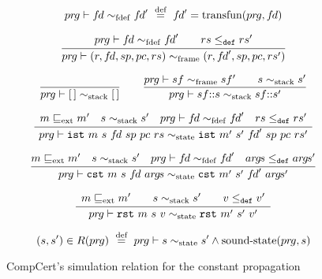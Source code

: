 
\begin{figure}[!]
$${pr\hspace*{-1pt}g} \vdash {f\hspace*{-1pt}d} \sim_{\mathrm{fdef}} {f\hspace*{-1pt}d}' ~\stackrel{\text{def}}{=}~ {f\hspace*{-1pt}d}' = \mathrm{transfun}({pr\hspace*{-1pt}g},{f\hspace*{-1pt}d})$$

\[
 \frac{
\begin{array}{c}
{pr\hspace*{-1pt}g} \vdash {f\hspace*{-1pt}d} \sim_{\mathrm{fdef}} {f\hspace*{-1pt}d}' \qquad
 rs \le_{\mathtt{def}} rs'
\end{array}
 }
 {
{pr\hspace*{-1pt}g} \vdash (r,{f\hspace*{-1pt}d},sp,pc,rs) \sim_{\mathrm{frame}} (r,{f\hspace*{-1pt}d}',sp,pc,rs')
 }
\]

\[
\frac{
}{
{pr\hspace*{-1pt}g} \vdash  [\,] \sim_{\mathrm{stack}} [\,]
}
\qquad
\frac{
{pr\hspace*{-1pt}g} \vdash  sf \sim_{\mathrm{frame}} sf' \qquad s \sim_{\mathrm{stack}} s'
}{
{pr\hspace*{-1pt}g} \vdash  sf{::}s \sim_{\mathrm{stack}} sf{::}s'
}
\]


\[
 \frac{
\begin{array}{c}
 m \sqsubseteq_\mathrm{ext}  m' \quad
 s \sim_{\mathrm{stack}} s' \quad
{pr\hspace*{-1pt}g} \vdash {f\hspace*{-1pt}d} \sim_{\mathrm{fdef}} {f\hspace*{-1pt}d}' \quad
 rs \le_{\mathtt{def}} rs'
\end{array}
 }
 {
{pr\hspace*{-1pt}g} \vdash
\mathtt{ist}~m~s~{f\hspace*{-1pt}d}~sp~pc~rs \sim_{\mathrm{state}}
\mathtt{ist}~m'~s'~{f\hspace*{-1pt}d}'~sp~pc~rs'
 }
\]


\[
 \frac{
\begin{array}{@{}c@{}}
m \sqsubseteq_\mathrm{ext}  m' \quad
s \simStack s' \quad
\vprg \vdash \vfd \simFun \vfd' \quad
\vargs \le_\rtldef \vargs' 
\end{array}
 }
 {
\vprg \vdash
\rtlcst~m~s~\vfd~\vargs \simState 
\rtlcst~m'~s'~\vfd'~\vargs'
 }
\]

\[
 \frac{
\begin{array}{c}
 m \sqsubseteq_\mathrm{ext}  m' \qquad
 s \sim_{\mathrm{stack}} s' \qquad
 v \le_{\mathtt{def}} v'
\end{array}
 }
 {
{pr\hspace*{-1pt}g} \vdash
\mathtt{rst}~m~s~v \sim_{\mathrm{state}}
\mathtt{rst}~m'~s'~v'
 }
\]

\[
(s,s') \in R({pr\hspace*{-1pt}g}) ~\stackrel{\text{def}}{=}~  {pr\hspace*{-1pt}g} \vdash s \sim_{\mathrm{state}} s' \land \mathrm{sound\text{-}state}({pr\hspace*{-1pt}g}, s)
\]
\caption{CompCert's simulation relation for the constant propagation}
\label{fig:background-simrel}
\end{figure}

